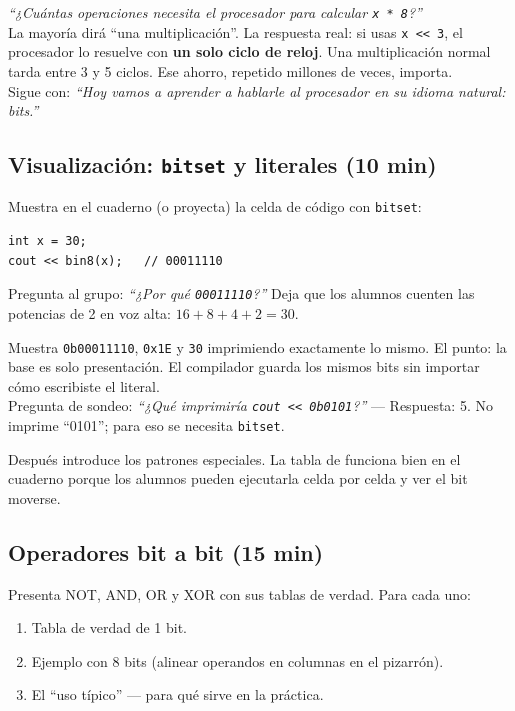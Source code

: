 \documentclass[12pt, oneside]{article}
\begin{document}
\begin{notaprofesor}
  \textit{``¿Cuántas operaciones necesita el procesador para calcular
  \texttt{x * 8}?''}\\[4pt]
  La mayoría dirá ``una multiplicación''. La respuesta real: si usas
  \texttt{x << 3}, el procesador lo resuelve con \textbf{un solo ciclo de
  reloj}. Una multiplicación normal tarda entre 3 y 5 ciclos.
  Ese ahorro, repetido millones de veces, importa.\\[4pt]
  Sigue con: \textit{``Hoy vamos a aprender a hablarle al procesador en su
  idioma natural: bits.''}
\end{notaprofesor}

\subsection{Visualización: \texttt{bitset} y literales (10 min)}

Muestra en el cuaderno (o proyecta) la celda de código con \texttt{bitset}:
\begin{verbatim}
int x = 30;
cout << bin8(x);   // 00011110
\end{verbatim}

Pregunta al grupo: \textit{``¿Por qué \texttt{00011110}?''} Deja que los
alumnos cuenten las potencias de 2 en voz alta: $16+8+4+2=30$.

\begin{notaprofesor}
  Muestra \texttt{0b00011110}, \texttt{0x1E} y \texttt{30} imprimiendo
  exactamente lo mismo. El punto: la base es solo presentación. El compilador
  guarda los mismos bits sin importar cómo escribiste el literal.\\[4pt]
  Pregunta de sondeo: \textit{``¿Qué imprimiría
  \texttt{cout << 0b0101}?''} — Respuesta: 5. No imprime ``0101''; para eso
  se necesita \texttt{bitset}.
\end{notaprofesor}

Después introduce los patrones especiales. La tabla de 
funciona bien en el cuaderno porque los alumnos pueden ejecutarla celda
por celda y ver el bit moverse.

\subsection{Operadores bit a bit (15 min)}

Presenta NOT, AND, OR y XOR con sus tablas de verdad. Para cada uno:
\begin{enumerate}
  \item Tabla de verdad de 1 bit.
  \item Ejemplo con 8 bits (alinear operandos en columnas en el pizarrón).
  \item El ``uso típico'' — para qué sirve en la práctica.
\end{enumerate}
\end{document}
